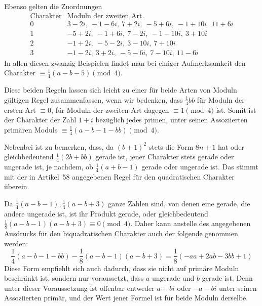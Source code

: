 Ebenso gelten die Zuordnungen
\[
\begin{array}{c|l}
\text{Charakter}&\text{Moduln der zweiten Art.}\\\hline
0&3-2i,\ -1-6i,\ 7+2i,\ -5+6i,\ -1+10i,\ 11+6i\\
1&-5+2i,\ -1+6i,\ 7-2i,\ -1-10i,\ 3+10i\\
2&-1+2i,\ -5-2i,\ 3-10i,\ 7+10i\\
3&-1-2i,\ 3+2i,\ -5-6i,\ 7-10i,\ 11-6i
\end{array}
\]
In allen diesen zwanzig Beispielen findet man bei einiger Aufmerksamkeit den Charakter $\equiv\frac14(a-b-5)\pmod4$.

Diese beiden Regeln lassen sich leicht zu einer für beide Arten von Moduln gültigen Regel zusammenfassen, wenn wir bedenken, dass $\frac14bb$ für Moduln der ersten Art $\equiv0$, für Moduln der zweiten Art dagegen $\equiv1\pmod4$ ist. Somit ist der Charakter der Zahl $1+i$ bezüglich jedes primen, unter seinen Assoziierten primären Moduls $\equiv\frac14(a-b-1-bb)\pmod4$.

Nebenbei ist zu bemerken, dass, da $(b+1)^2$ stets die Form $8n+1$ hat oder gleichbedeutend $\frac14(2b+bb)$ gerade ist, jener Charakter stets gerade oder ungerade ist, je nachdem, ob $\frac14(a+b-1)$ gerade oder ungerade ist. Das stimmt mit der in Artikel~58 angegebenen Regel für den quadratischen Charakter überein.

Da $\frac14(a-b-1),\frac14(a-b+3)$ ganze Zahlen sind, von denen eine gerade, die andere ungerade ist, ist ihr Produkt gerade, oder gleichbedeutend $\frac18(a-b-1)(a-b+3)\equiv0\pmod4$. Daher kann anstelle des angegebenen Ausdrucks für den biquadratischen Charakter auch der folgende genommen werden:
\[
\frac14(a-b-1-bb)-\frac18(a-b-1)(a-b+3)=\frac18(-aa+2ab-3bb+1)
\]
Diese Form empfiehlt sich auch dadurch, dass sie nicht auf primäre Moduln beschränkt ist, sondern nur voraussetzt, dass $a$ ungerade und $b$ gerade ist. Denn unter dieser Voraussetzung ist offenbar entweder $a+bi$ oder $-a-bi$ unter seinen Assoziierten primär, und der Wert jener Formel ist für beide Moduln derselbe.
